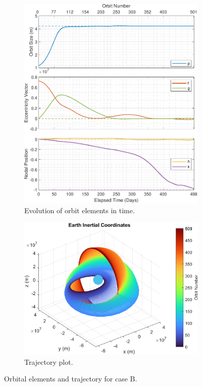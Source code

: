 \begin{figure}[H]
    \centering
    \begin{subfigure}[t]{0.4\textwidth}
        \includegraphics[width=\textwidth]{figures/oguri_G/orbital_elements.pdf}
        \caption{Evolution of orbit elements in time.}
        \label{fig:results_results_b_a}
    \end{subfigure}
    \begin{subfigure}[t]{0.59\textwidth}
        \includegraphics[width=\textwidth]{figures/oguri_G/trajectory_plot.png}
        \caption{Trajectory plot.}
        \label{fig:results_results_b_b}
    \end{subfigure}
    \caption{Orbital elements and trajectory for case B.}
    \label{fig:results_results_b}
\end{figure}
